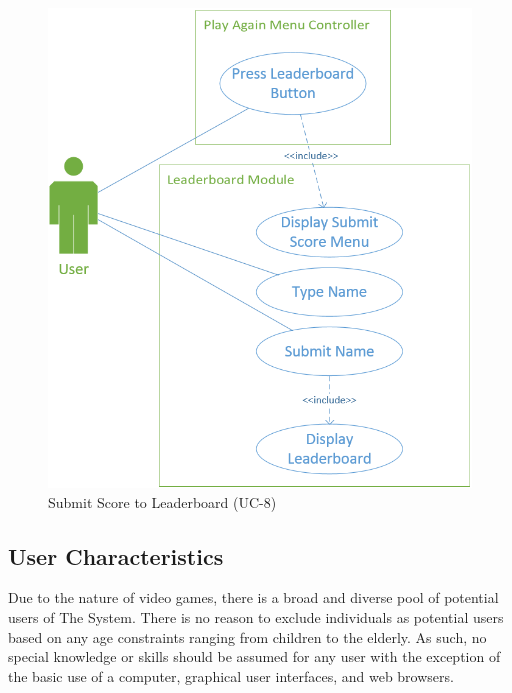\documentclass[12pt]{report}
\begin{document}
	\begin{figure}
		\centering
		\includegraphics[scale=0.5]{images/SubmitScore.png}
		\caption{Submit Score to Leaderboard (UC-8)}
	\end{figure}
	\newpage
	\subsection{User Characteristics}
		Due to the nature of video games, there is a broad and diverse pool of potential users of The System. There is no reason to exclude individuals as potential users based on any age constraints ranging from children to the elderly. As such, no special knowledge or skills should be assumed for any user with the exception of the basic use of a computer, graphical user interfaces, and web browsers.
\end{document}

